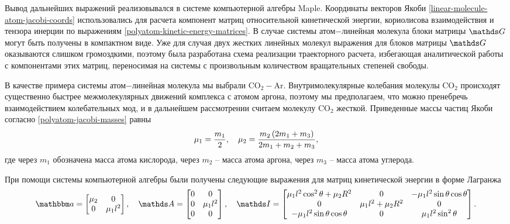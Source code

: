 Вывод дальнейших выражений реализовывался в системе компьютерной алгебры Maple. Координаты векторов Якоби \eqref{linear-molecule-atom-jacobi-coords} использовались для расчета компонент матриц относительной кинетической энергии, кориолисова взаимодействия и тензора инерции по выражениям \eqref{polyatom-kinetic-energy-matrices}. В случае системы атом$-$линейная молекула блоки матрицы $\bbG$ могут быть получены в компактном виде. Уже для случая двух жестких линейных молекул выражения для блоков матрицы $\bbG$ оказываются слишком громоздкими, поэтому была разработана схема реализации траекторного расчета, избегающая аналитической работы с компонентами этих матриц, переносимая на системы с произвольным количеством вращательных степеней свободы. \par
В качестве примера системы атом$-$линейная молекула мы выбрали CO$_2-$Ar. Внутримолекулярные колебания молекулы CO$_2$ происходят существенно быстрее межмолекулярных движений комплекса с атомом аргона, поэтому мы предполагаем, что можно пренебречь взаимодействием колебательных мод, и в дальнейшем рассмотрении считаем молекулу CO$_2$ жесткой. 
Приведенные массы частиц Якоби согласно \eqref{polyatom-jacobi-masses} равны
\begin{gather}
    \mu_1 = \frac{m_1}{2}, \quad \mu_2 = \frac{m_2 \left( 2 m_1 + m_3 \right)}{2 m_1 + m_2 + m_3},
\end{gather}
% 
где через $m_1$ обозначена масса атома кислорода, через $m_2$ -- масса атома аргона, через $m_3$ -- масса атома углерода. \par
При помощи системы компьютерной алгебры были получены следующие выражения для матриц кинетической энергии в форме Лагранжа
\begin{gather}
	\bba =
	\begin{bmatrix}
		\mu_2 & 0 \\
		0 & \mu_1 l^2
	\end{bmatrix}, \quad 
	\bbA = 
	\begin{bmatrix}
		0 & 0 \\
		0 & \mu_1 l^2 \\
		0 & 0 
	\end{bmatrix}, \quad
	\bbI = 
	\begin{bmatrix}
		\mu_1 l^2 \cos^2 \theta + \mu_2 R^2 & 0 & -\mu_1 l^2 \sin \theta \cos \theta \\
		0 & \mu_1 l^2 + \mu_2 R^2 & 0 \\
		- \mu_1 l^2 \sin \theta \cos \theta & 0 & \mu_1 l^2 \sin^2 \theta
	\end{bmatrix}. \notag
\end{gather}

